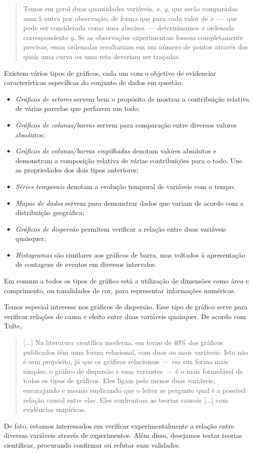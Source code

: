 \begin{quote}
	Temos em geral duas quantidades variáveis, $x$, $y$, que serão comparadas uma à outra por observação, de forma que para cada valor de $x$ ---~que pode ser considerada como uma abscissa~--- determinamos a ordenada correspondente $y$. Se as observações experimentais fossem completamente precisas, essas ordenadas resultariam em um número de pontos através dos quais uma curva ou uma reta deveriam ser traçadas.\cite{Lambert}
\end{quote}

Existem vários tipos de gráficos, cada um com o objetivo de evidenciar características específicas do conjunto de dados em questão:
\begin{itemize}
	\item \emph{Gráficos de setores} servem bem o propósito de mostrar a contribuição relativa de várias parcelas que perfazem um todo;
	\item \emph{Gráficos de colunas/barras} servem para comparação entre diversos valores absolutos;
	\item \emph{Gráficos de colunas/barras empilhadas} denotam valores absolutos e demonstram a composição relativa de várias contribuições para o todo. Une as propriedades dos dois tipos anteriores;
	\item \emph{Séries temporais} denotam a evolução temporal de variáveis com o tempo;
	\item \emph{Mapas de dados} servem para demonstrar dados que variam de acordo com a distribuição geográfica;
	\item \emph{Gráficos de dispersão} permitem verificar a relação entre duas variáveis quaisquer;
	\item \emph{Histogramas} são similares aos gráficos de barra, mas voltados à apresentação de contagens de eventos em diversos intervalos.
\end{itemize}
%
Em comum a todos os tipos de gráfico está a utilização de dimensões como área e comprimento, ou tonalidades de cor, para representar informações numéricas.

Temos especial interesse nos gráficos de dispersão. Esse tipo de gráfico serve para verificar relações de causa e efeito entre duas variáveis quaisquer. De acordo com Tufte,
\begin{quote}
	[...] Na literatura científica moderna, em torno de 40\% dos gráficos publicados têm uma forma relacional, com duas ou mais variáveis. Isto não é sem propósito, já que os gráficos relacionais ---~em sua forma mais simples, o gráfico de dispersão e suas variantes~--- é o mais formidável de todos os tipos de gráficos. Eles ligam pelo menos duas variáveis, encorajando e mesmo suplicando que o leitor se pergunte qual é a possível relação causal entre elas. Eles confrontam as teorias causais [...] com evidências empíricas.
\end{quote}
%
De fato, estamos interessados em verificar experimentalmente a relação entre diversas variáveis através de experimentos. Além disso, desejamos testar teorias científicas, procurando confirmar ou refutar suas validades.

